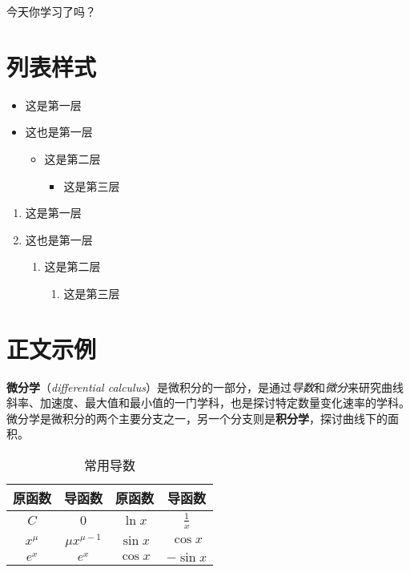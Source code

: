 \begin{alert}
	今天你学习了吗？
\end{alert}

\section{列表样式}
\begin{itemize}
	\item 这是第一层
	\item 这也是第一层
	\begin{itemize}
		\item 这是第二层
		\begin{itemize}
			\item 这是第三层
		\end{itemize}
	\end{itemize}
\end{itemize}

\begin{enumerate}
	\item 这是第一层
	\item 这也是第一层
	\begin{enumerate}
		\item 这是第二层
		\begin{enumerate}
			\item 这是第三层
		\end{enumerate}
	\end{enumerate}
\end{enumerate}

\section{正文示例}

\textbf{微分学}（\emph{differential calculus}）是微积分的一部分，是通过\emph{导数}和\emph{微分}来研究曲线斜率、加速度、最大值和最小值的一门学科，也是探讨特定数量变化速率的学科。微分学是微积分的两个主要分支之一，另一个分支则是\textbf{积分学}，探讨曲线下的面积。


\begin{table}[htbp]
	\centering
	\caption{常用导数}
	\begin{tabular}{cccc}
		\toprule
		\textbf{原函数} & \textbf{导函数}   & \textbf{原函数} & \textbf{导函数} \\
		\midrule
		$C$             & $0$               & $\ln x$         & $\frac{1}{x}$   \\
		$x^\mu$         & $\mu x^{\mu - 1}$ & $\sin x$        & $\cos x$        \\
		$e^x$           & $e^x$             & $\cos x$        & $-\sin x$       \\
		\bottomrule
	\end{tabular}
\end{table}

